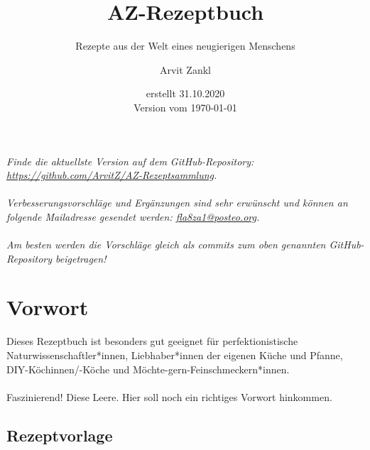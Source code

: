 \documentclass[a4paper, 12pt]{scrbook} 								%
\title{AZ-Rezeptbuch}
\subtitle{Rezepte aus der Welt eines neugierigen Menschens}
\author{Arvit Zankl}
\date{erstellt 31.10.2020  \\\vspace{1cm} Version vom \today}
\numberwithin{equation}{section} 									%
\begin{document}
\maketitle

\newpage

\textit{
Finde die aktuellste Version auf dem GitHub-Repository: \\\href{https://github.com/ArvitZ/AZ-Rezeptsammlung}{https://github.com/ArvitZ/AZ-Rezeptsammlung}. \\\\
Verbesserungsvorschläge und Ergänzungen sind sehr erwünscht und können an folgende Mailadresse gesendet werden: \href{mailto:fla8za1@posteo.org}{fla8za1@posteo.org}. \\\\
Am besten werden die Vorschläge gleich als commits zum oben genannten GitHub-Repository beigetragen!
}

\thispagestyle{empty}	%
\tableofcontents




\chapter{Vorwort}
	\setcounter{page}{1}
	Dieses Rezeptbuch ist besonders gut geeignet für perfektionistische Naturwissenschaftler*innen, Liebhaber*innen der eigenen Küche und Pfanne, DIY-Köchinnen/-Köche und Möchte-gern-Feinschmeckern*innen.	
\\
\\
	Faszinierend! Diese Leere. Hier soll noch ein richtiges Vorwort hinkommen.
	\newpage



\section{Rezeptvorlage}	\label{Rezeptlabel}
\end{document}
